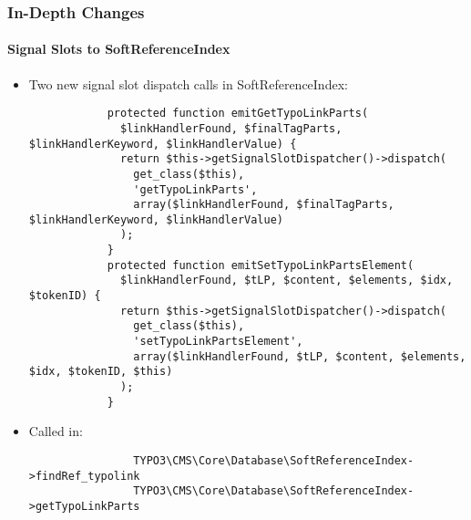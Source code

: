 \begin{frame}[fragile]
	\frametitle{In-Depth Changes}
	\framesubtitle{Signal Slots to SoftReferenceIndex}

	\lstset{
		basicstyle=\tiny\ttfamily
	}

	\begin{itemize}
		\item
			\smaller
				Two new signal slot dispatch calls in SoftReferenceIndex:
			\normalsize

		\begin{lstlisting}
			protected function emitGetTypoLinkParts(
			  $linkHandlerFound, $finalTagParts, $linkHandlerKeyword, $linkHandlerValue) {
			  return $this->getSignalSlotDispatcher()->dispatch(
			    get_class($this),
			    'getTypoLinkParts',
			    array($linkHandlerFound, $finalTagParts, $linkHandlerKeyword, $linkHandlerValue)
			  );
			}
			protected function emitSetTypoLinkPartsElement(
			  $linkHandlerFound, $tLP, $content, $elements, $idx, $tokenID) {
			  return $this->getSignalSlotDispatcher()->dispatch(
			    get_class($this),
			    'setTypoLinkPartsElement',
			    array($linkHandlerFound, $tLP, $content, $elements, $idx, $tokenID, $this)
			  );
			}
		\end{lstlisting}

		\item
			\smaller
				Called in:
			\normalsize

			\begin{lstlisting}
				TYPO3\CMS\Core\Database\SoftReferenceIndex->findRef_typolink
				TYPO3\CMS\Core\Database\SoftReferenceIndex->getTypoLinkParts
			\end{lstlisting}

	\end{itemize}

\end{frame}


